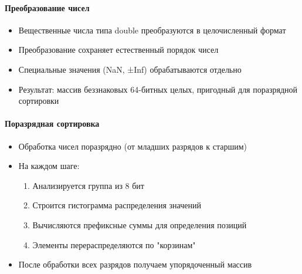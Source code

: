 \documentclass[12pt]{article}
\begin{document}
\paragraph{Преобразование чисел}
\begin{itemize}
    \item Вещественные числа типа double преобразуются в целочисленный формат
    \item Преобразование сохраняет естественный порядок чисел
    \item Специальные значения (NaN, ±Inf) обрабатываются отдельно
    \item Результат: массив беззнаковых 64-битных целых, пригодный для поразрядной сортировки
\end{itemize}

\paragraph{Поразрядная сортировка}
\begin{itemize}
    \item Обработка чисел поразрядно (от младших разрядов к старшим)
    \item На каждом шаге:
    \begin{enumerate}
        \item Анализируется группа из 8 бит
        \item Строится гистограмма распределения значений
        \item Вычисляются префиксные суммы для определения позиций
        \item Элементы перераспределяются по "корзинам"
    \end{enumerate}
    \item После обработки всех разрядов получаем упорядоченный массив
\end{itemize}
\end{document}
